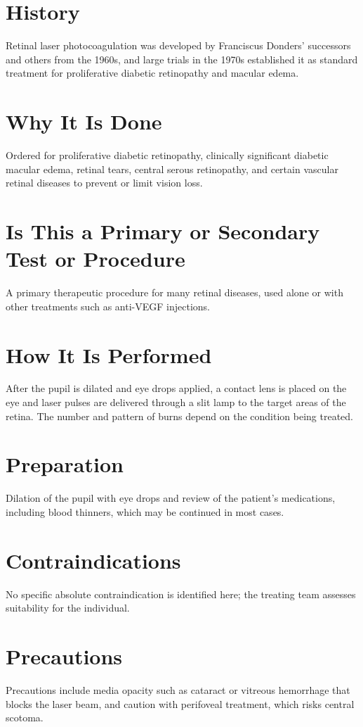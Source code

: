 \section*{History}
Retinal laser photocoagulation was developed by Franciscus Donders' successors and others from the 1960s, and large trials in the 1970s established it as standard treatment for proliferative diabetic retinopathy and macular edema.
\section*{Why It Is Done}
Ordered for proliferative diabetic retinopathy, clinically significant diabetic macular edema, retinal tears, central serous retinopathy, and certain vascular retinal diseases to prevent or limit vision loss.
\section*{Is This a Primary or Secondary Test or Procedure}
A primary therapeutic procedure for many retinal diseases, used alone or with other treatments such as anti-VEGF injections.
\section*{How It Is Performed}
After the pupil is dilated and eye drops applied, a contact lens is placed on the eye and laser pulses are delivered through a slit lamp to the target areas of the retina. The number and pattern of burns depend on the condition being treated.
\section*{Preparation}
Dilation of the pupil with eye drops and review of the patient's medications, including blood thinners, which may be continued in most cases.
\section*{Contraindications}
No specific absolute contraindication is identified here; the treating team assesses suitability for the individual.

\section*{Precautions}
Precautions include media opacity such as cataract or vitreous hemorrhage that blocks the laser beam, and caution with perifoveal treatment, which risks central scotoma.

